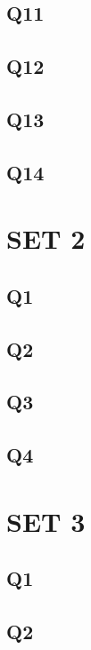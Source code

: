 \documentclass{article}
\begin{document}
\subsection{Q11}

\subsection{Q12}

\subsection{Q13}

\subsection{Q14}

\section{SET 2}

\subsection{Q1}

\subsection{Q2}

\subsection{Q3}

\subsection{Q4}

\section{SET 3}

\subsection{Q1}

\subsection{Q2}
\end{document}
